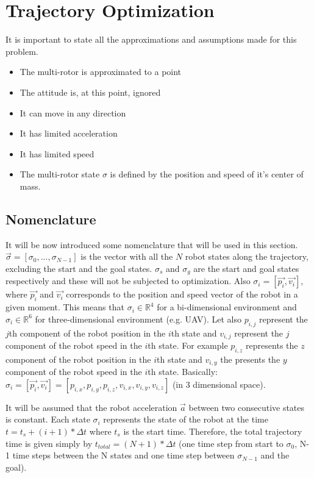 \section{Trajectory Optimization}
\label{chapter:optimization}
It is important to state all the approximations and assumptions made for this problem.
\begin{itemize}
    \item The multi-rotor is approximated to a point
    \item The attitude is, at this point, ignored
    \item It can move in any direction
    \item It has limited acceleration
    \item It has limited speed
    \item The multi-rotor state $\sigma$ is defined by the position and speed of it's center of mass.
\end{itemize}

\subsection{Nomenclature}
It will be now introduced some nomenclature that will be used in this section. $\vec{\sigma}=[\sigma_0, ... , \sigma_{N-1}]$ is the vector with all the $N$ robot states along the trajectory, excluding the start and the goal states. $\sigma_s$ and $\sigma_g$ are the start and goal states respectively and these will not be subjected to optimization. Also $\sigma_i = [ \vec{p_i}, \vec{v_i}]$, where $\vec{p_i}$ and $\vec{v_i}$ corresponds to the position and speed vector of the robot in a given moment.  This means that $\sigma_i \in \mathbb{R}^4$ for a bi-dimensional environment  and $\sigma_i \in \mathbb{R}^6$ for three-dimensional environment (e.g. UAV). Let also $p_{i,j}$ represent the $j$th component of the robot position in the $i$th state and $v_{i,j}$ represent the $j$ component of the robot speed in the $i$th state. For example $p_{i,z}$  represents the $z$ component of the robot position in the $i$th state and $v_{i,y}$  the presents the $y$ component of the robot speed in the $i$th state.  Basically: $\sigma_i = [ \vec{p_i}, \vec{v_i}] = [p_{i,x}, p_{i,y}, p_{i,z}, v_{i,x}, v_{i,y}, v_{i,z}]$ (in 3 dimensional space).

It will be assumed that the robot acceleration $\vec{a}$ between two consecutive states is constant. Each state $\sigma_i$ represents the state of the robot at the time $t=t_s+(i+1)*\Delta t$ where $t_s$ is the start time. Therefore, the total trajectory time is given simply by $t_{total}= (N+1)* \Delta t$ (one time step from start to $\sigma_0$, N-1 time steps between the N states and one time step between $\sigma_{N-1}$ and the goal).


